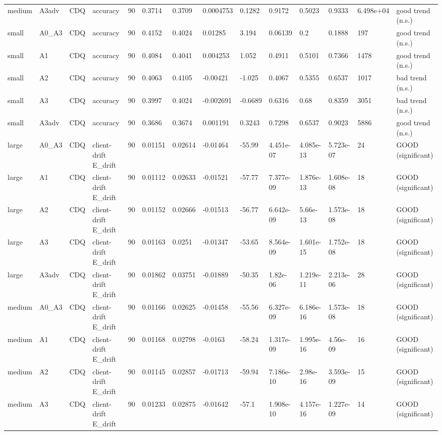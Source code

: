 \begin{table}[t]
\begin{tabular}{llllllllllllll}
medium & A3adv & CDQ & accuracy & 90 & 0.3714 & 0.3709 & 0.0004753 & 0.1282 & 0.9172 & 0.5023 & 0.9333 & 6.498e+04 & good trend (n.s.) \\
small & A0\_A3 & CDQ & accuracy & 90 & 0.4152 & 0.4024 & 0.01285 & 3.194 & 0.06139 & 0.2 & 0.1888 & 197 & good trend (n.s.) \\
small & A1 & CDQ & accuracy & 90 & 0.4084 & 0.4041 & 0.004253 & 1.052 & 0.4911 & 0.5101 & 0.7366 & 1478 & good trend (n.s.) \\
small & A2 & CDQ & accuracy & 90 & 0.4063 & 0.4105 & -0.00421 & -1.025 & 0.4067 & 0.5355 & 0.6537 & 1017 & bad trend (n.s.) \\
small & A3 & CDQ & accuracy & 90 & 0.3997 & 0.4024 & -0.002691 & -0.6689 & 0.6316 & 0.68 & 0.8359 & 3051 & bad trend (n.s.) \\
small & A3adv & CDQ & accuracy & 90 & 0.3686 & 0.3674 & 0.001191 & 0.3243 & 0.7298 & 0.6537 & 0.9023 & 5886 & good trend (n.s.) \\
large & A0\_A3 & CDQ & client-drift E\_drift & 90 & 0.01151 & 0.02614 & -0.01464 & -55.99 & 4.451e-07 & 4.085e-13 & 5.723e-07 & 24 & GOOD (significant) \\
large & A1 & CDQ & client-drift E\_drift & 90 & 0.01112 & 0.02633 & -0.01521 & -57.77 & 7.377e-09 & 1.876e-13 & 1.608e-08 & 18 & GOOD (significant) \\
large & A2 & CDQ & client-drift E\_drift & 90 & 0.01152 & 0.02666 & -0.01513 & -56.77 & 6.642e-09 & 5.66e-13 & 1.573e-08 & 18 & GOOD (significant) \\
large & A3 & CDQ & client-drift E\_drift & 90 & 0.01163 & 0.0251 & -0.01347 & -53.65 & 8.564e-09 & 1.601e-15 & 1.752e-08 & 18 & GOOD (significant) \\
large & A3adv & CDQ & client-drift E\_drift & 90 & 0.01862 & 0.03751 & -0.01889 & -50.35 & 1.82e-06 & 1.219e-11 & 2.213e-06 & 28 & GOOD (significant) \\
medium & A0\_A3 & CDQ & client-drift E\_drift & 90 & 0.01166 & 0.02625 & -0.01458 & -55.56 & 6.327e-09 & 6.186e-16 & 1.573e-08 & 18 & GOOD (significant) \\
medium & A1 & CDQ & client-drift E\_drift & 90 & 0.01168 & 0.02798 & -0.0163 & -58.24 & 1.317e-09 & 1.995e-16 & 4.56e-09 & 16 & GOOD (significant) \\
medium & A2 & CDQ & client-drift E\_drift & 90 & 0.01145 & 0.02857 & -0.01713 & -59.94 & 7.186e-10 & 2.98e-16 & 3.593e-09 & 15 & GOOD (significant) \\
medium & A3 & CDQ & client-drift E\_drift & 90 & 0.01233 & 0.02875 & -0.01642 & -57.1 & 1.908e-10 & 4.157e-16 & 1.227e-09 & 14 & GOOD (significant) \\

\end{tabular}
\end{table}
